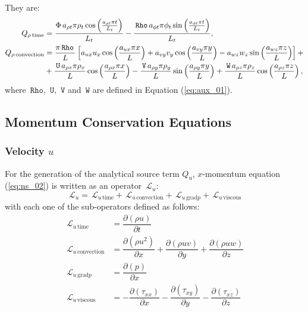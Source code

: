 \documentclass[10pt]{article}
\newcommand{\Diff}[2] {\dfrac{\partial( #1)}{\partial #2}}
\newcommand{\Rho}{\,\mathtt{Rho}}
\newcommand{\U}{\,\mathtt{U}}
\newcommand{\V}{\,\mathtt{V}}
\newcommand{\W}{\,\mathtt{W}}
\newcommand{\Lo}{\,\mathcal{L}}
\newcommand{\convection}{\text{convection}}
\newcommand{\gradp}{\text{grad}p}
\newcommand{\viscous}{\text{viscous}}
\begin{document}
They are:
\begin{equation*}
 \begin{split}
 Q_{\rho \, \text{time}}&= 
\frac{ \Phi \,  a_{\rho t} \pi\rho_{t} \cos\left(\frac{a_{\rho t} \pi t}{L_t}\right)}{L_t} - \frac{ \Rho \, a_{\phi t} \pi\phi_{t} \sin\left(\frac{a_{\phi t} \pi t}{L_t}\right)}{L_t}, \\\vspace{20pt}
%
 Q_{\rho \, \text{convection}}&= 
\frac{\pi \Rho \, }{L} \left[a_{ux} u_{x} \cos\left(\frac{a_{ux} \pi x}{L}\right) + a_{vy} v_{y} \cos\left(\frac{a_{vy} \pi y}{L}\right) - a_{wz} w_{z} \sin\left(\frac{a_{wz} \pi z}{L}\right)\right] + \\ 
&+ \frac{ \U \, a_{\rho x} \pi\rho_{x} }{L}\cos\left(\frac{a_{\rho x} \pi x}{L}\right)  - \frac{ \V \, a_{\rho y} \pi\rho_{y} }{L}\sin\left(\frac{a_{\rho y} \pi y}{L}\right)+ \frac{ \W \, a_{\rho z} \pi\rho_{z} }{L}\cos\left(\frac{a_{\rho z} \pi z}{L}\right),
 \end{split}
\end{equation*}
where $\Rho,\,\U,\,\V$ and $\W$  are defined in Equation (\ref{eq:aux_01}).


\subsection{Momentum Conservation Equations}

\subsubsection{Velocity $u$}
For the generation of the analytical source term $Q_u$, $x$-momentum equation (\ref{eq:ns_02}) is written as an operator $\Lo_u$:
 $$\Lo_u = \Lo_{u \, \text{time}}+\Lo_{u \, \convection}+\Lo_{u \, \gradp }+\Lo_{u \, \viscous }$$
with each one of the sub-operators defined as follows:
\begin{equation*}
 \begin{split}
\Lo_{u \, \text{time}}&= \Diff{\rho u}{t} \\
\Lo_{u \, \convection}&= \Diff{\rho u^2 }{x}+\Diff{\rho uv}{y} +\Diff{\rho uw}{z}\\
\Lo_{u \, \gradp }&= \Diff{p}{x}\\
\Lo_{u \, \viscous }&= -\Diff{\tau_{xx}}{x}-\Diff{\tau_{xy}}{y}-\Diff{\tau_{xz}}{z}
 \end{split}
\end{equation*}
\end{document}
